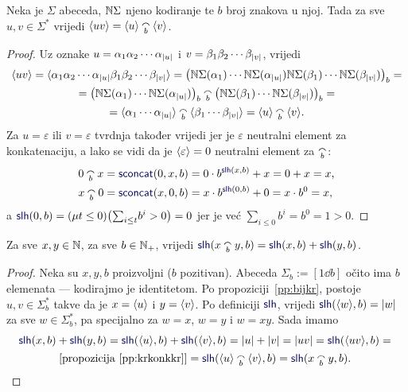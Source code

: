 \begin{propozicija}[{name=[prateća funkcija konkatenacije nad $\Sigma$]}]\label{pp:krkonkkr}
Neka je $\Sigma$ abeceda, ${\mathbb N}\Sigma$ njeno kodiranje te $b$ broj znakova u njoj. Tada za sve $u,v\in\Sigma^*$ vrijedi
    $\kr{uv}=\kr u\conc b\kr v$.
\end{propozicija}
\begin{proof}
Uz oznake $u=\alpha_1\alpha_2\dotsm\alpha_{\lvert u\rvert}$ i $v=\beta_1\beta_2\dotsm\beta_{\lvert v\rvert}$, vrijedi
\begin{multline}
\kr{uv}=\kr{\alpha_1\alpha_2\dotsm\alpha_{\dulj u}\beta_1\beta_2\dotsm\beta_{\dulj v}}=\bigl(
\N\Sigma(\alpha_1)
\dotsm
\N\Sigma(\alpha_{\dulj u})
\N\Sigma(\beta_1)
\dotsm
\N\Sigma(\beta_{\dulj v})
\bigr)_b=\\
=\bigl(
\N\Sigma(\alpha_1)
\dotsm
\N\Sigma(\alpha_{\dulj u})
\bigr)_b\conc b\bigl(
\N\Sigma(\beta_1)
\dotsm
\N\Sigma(\beta_{\dulj v})
\bigr)_b=\\
=\kr{\alpha_1\dotsm\alpha_{\dulj u}}\conc b\kr{\beta_1\dotsm\beta_{\dulj v}}=\kr u\conc b\kr v\text.
\end{multline}
Za $u=\varepsilon$ ili $v=\varepsilon$ tvrdnja također vrijedi jer je $\varepsilon$ neutralni element za konkatenaciju, a lako se vidi da je $\langle\varepsilon\rangle=0$ neutralni element za $\conc b$:
\begin{align}
    0\conc bx&=\f{sconcat}(0,x,b)=0\cdot b^{\f{slh}(x,b)}+x=0+x=x\text,\\
    x\conc b0&=\f{sconcat}(x,0,b)=x\cdot b^{\f{slh}(0,b)}+0=x\cdot b^0=x\text,
\end{align}
a $\f{slh}(0,b)=(\mu t\le 0)\bigl(\sum_{i\le t}\!b^i>0\bigr)=0$ jer je već $\sum_{i\le0}b^i=b^0=1>0$.
\end{proof}

\begin{korolar}[{name=[duljina konkatenacije je zbroj duljina]}]\label{kor:lhkonk=lh+lh}
Za sve $x,y\in{\mathbb N}$, za sve $b\in{\mathbb N}_+$, vrijedi $\f{slh}(x\conc b y,b)=\f{slh}(x,b)+\f{slh}(y,b)$.
\end{korolar}
\begin{proof}
Neka su $x,y,b$ proizvoljni ($b$ pozitivan). Abeceda $\Sigma_b:=[1\dd b]$ očito ima $b$ elemenata --- kodirajmo je identitetom.
Po propoziciji~\ref{pp:bijkr}, postoje $u,v\in\Sigma_b^*$ takve da je $x=\langle u\rangle$ i $y=\langle v\rangle$. Po definiciji $\f{slh}$, vrijedi $\f{slh}(\kr w,b)=\dulj w$ za sve $w\in\Sigma_b^*$, pa specijalno za $w=x$, $w=y$ i $w=xy$. Sada imamo
\begin{multline}
    \f{slh}(x,b)+\f{slh}(y,b)=
    \f{slh}(\kr u,b)+\f{slh}(\kr v,b)=
    \dulj u+\dulj v=
    \dulj{uv}=
    \f{slh}(\kr{uv},b)={}\\
    \text{[propozicija \ref{pp:krkonkkr}]}{}=\f{slh}(\kr u\conc b\kr v,b)=
    \f{slh}(x\conc b y,b)\text{.\;\qedhere}
\end{multline}
\end{proof}

